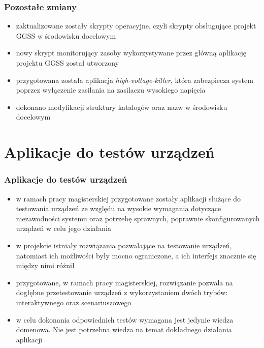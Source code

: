 \documentclass[10pt]{beamer}
\begin{document}
\begin{frame}
\frametitle{Pozostałe zmiany}
\begin{itemize}
    \item zaktualizowane zostały skrypty operacyjne, czyli skrypty obsługujące projekt GGSS w środowisku docelowym
    \item nowy skrypt monitorujący zasoby wykorzystywane przez główną aplikację projektu GGSS został utworzony
    \item przygotowana została aplikacja \emph{high-voltage-killer}, która zabezpiecza system poprzez wyłączenie zasilania na zasilaczu wysokiego napięcia
    \item dokonano modyfikacji struktury katalogów oraz nazw w środowisku docelowym
\end{itemize}
\end{frame}

\section{Aplikacje do testów urządzeń}

\begin{frame}
\frametitle{Aplikacje do testów urządzeń}
    \begin{itemize}
        \item w ramach pracy magisterskiej przygotowane zostały aplikacji służące do testowania urządzeń ze względu na wysokie wymagania dotyczące niezawodności systemu oraz potrzebę sprawnych, poprawnie skonfigurowanych urządzeń w celu jego działania
        \item w projekcie istniały rozwiązania pozwalające na testowanie urządzeń, natomiast ich możliwości były mocno ograniczone, a ich interfejs znacznie się między nimi różnił
        \item przygotowane, w ramach pracy magisterskiej, rozwiązanie pozwala na dogłębne przetestowanie urządzeń z wykorzystaniem dwóch trybów: interaktywnego oraz scenariuszowego
        \item w celu dokonania odpowiednich testów wymagana jest jedynie wiedza domenowa. Nie jest potrzebna wiedza na temat dokładnego działania aplikacji
    \end{itemize}
\end{frame}
\end{document}
